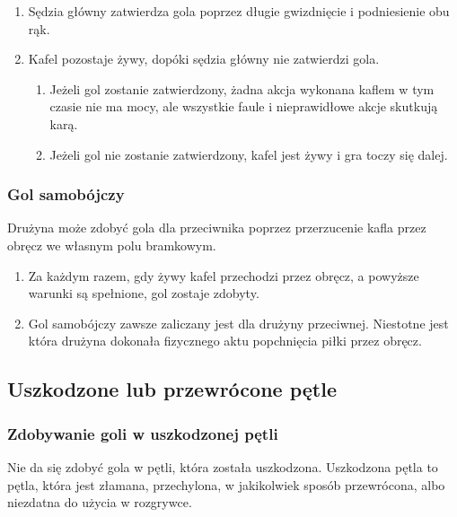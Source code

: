 \documentclass[12pt]{article}
\begin{document}
\begin{enumerate}
  \begin{enumerate}
  \item
        Sędzia główny zatwierdza gola poprzez długie gwizdnięcie i
    podniesienie obu rąk.
      \item
        Kafel pozostaje żywy, dopóki sędzia główny nie zatwierdzi gola.
    
    \begin{enumerate}
    \item
            Jeżeli gol zostanie zatwierdzony, żadna akcja wykonana kaflem w
      tym czasie nie ma mocy, ale wszystkie faule i nieprawidłowe akcje
      skutkują karą.
          \item
            Jeżeli gol nie zostanie zatwierdzony, kafel jest żywy i gra toczy
      się dalej.
          \end{enumerate}
  \end{enumerate}
\end{enumerate}

\subsubsection{Gol samobójczy}
Drużyna może zdobyć gola dla
przeciwnika poprzez przerzucenie kafla przez obręcz we własnym polu
bramkowym.

\begin{enumerate}
\item
    Za każdym razem, gdy żywy kafel przechodzi przez obręcz, a powyższe
  warunki są spełnione, gol zostaje zdobyty.
  \item
    Gol samobójczy zawsze zaliczany jest dla drużyny przeciwnej. Niestotne
  jest która drużyna dokonała fizycznego aktu popchnięcia piłki przez
  obręcz.
  \end{enumerate}

\subsection{Uszkodzone lub przewrócone pętle}

\subsubsection{Zdobywanie goli w uszkodzonej pętli}
Nie da się zdobyć
gola w pętli, która została uszkodzona. Uszkodzona pętla to pętla, która
jest złamana, przechylona, w jakikolwiek sposób przewrócona, albo
niezdatna do użycia w rozgrywce.
\end{document}
